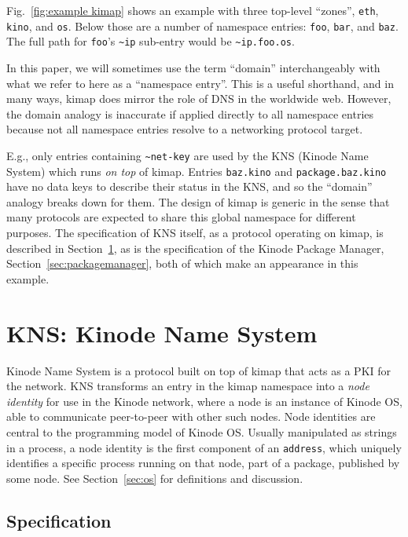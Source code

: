 \documentclass[runningheads]{llncs}
\begin{document}
Fig.~\ref{fig:example kimap} shows an example with three top-level ``zones'', \verb|eth|, \verb|kino|, and \verb|os|.
Below those are a number of namespace entries: \verb|foo|, \verb|bar|, and \verb|baz|.
The full path for \verb|foo|'s \verb|~ip| sub-entry would be \verb|~ip.foo.os|.

In this paper, we will sometimes use the term ``domain'' interchangeably with what we refer to here as a ``namespace entry''.
This is a useful shorthand, and in many ways, kimap does mirror the role of DNS in the worldwide web.
However, the domain analogy is inaccurate if applied directly to all namespace entries because not all namespace entries resolve to a networking protocol target.

E.g., only entries containing \verb|~net-key| are used by the KNS (Kinode Name System) which runs \textit{on top} of kimap.
Entries \verb|baz.kino| and \verb|package.baz.kino| have no data keys to describe their status in the KNS, and so the ``domain'' analogy breaks down for them.
The design of kimap is generic in the sense that many protocols are expected to share this global namespace for different purposes.
The specification of KNS itself, as a protocol operating on kimap, is described in Section~\ref{sec:kns}, as is the specification of the Kinode Package Manager, Section~\ref{sec:packagemanager}, both of which make an appearance in this example.

\section{KNS: Kinode Name System}
\label{sec:kns}

Kinode Name System is a protocol built on top of kimap that acts as a PKI for the network.
KNS transforms an entry in the kimap namespace into a \textit{node identity} for use in the Kinode network, where a node is an instance of Kinode OS, able to communicate peer-to-peer with other such nodes.
Node identities are central to the programming model of Kinode OS.
Usually manipulated as strings in a process, a node identity is the first component of an \verb|address|, which uniquely identifies a specific process running on that node, part of a package, published by some node. See Section~\ref{sec:os} for definitions and discussion.

\subsection{Specification}
\label{sec:knsspec}
\end{document}
